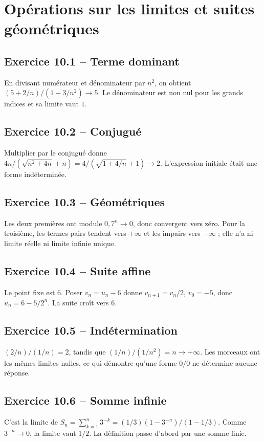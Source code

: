 \chapter{Opérations sur les limites et suites géométriques}
\section*{Exercice 10.1 -- Terme dominant}
En divisant numérateur et dénominateur par $n^2$, on obtient $(5+2/n)/(1-3/n^2)\to5$. Le dénominateur est non nul pour les grands indices et sa limite vaut $1$.

\section*{Exercice 10.2 -- Conjugué}
Multiplier par le conjugué donne $4n/(\sqrt{n^2+4n}+n)=4/(\sqrt{1+4/n}+1)\to2$. L'expression initiale était une forme indéterminée.

\section*{Exercice 10.3 -- Géométriques}
Les deux premières ont module $0{,}7^n\to0$, donc convergent vers zéro. Pour la troisième, les termes pairs tendent vers $+\infty$ et les impairs vers $-\infty$ ; elle n'a ni limite réelle ni limite infinie unique.

\section*{Exercice 10.4 -- Suite affine}
Le point fixe est $6$. Poser $v_n=u_n-6$ donne $v_{n+1}=v_n/2$, $v_0=-5$, donc $u_n=6-5/2^n$. La suite croît vers $6$.

\section*{Exercice 10.5 -- Indétermination}
$(2/n)/(1/n)=2$, tandis que $(1/n)/(1/n^2)=n\to+\infty$. Les morceaux ont les mêmes limites nulles, ce qui démontre qu'une forme $0/0$ ne détermine aucune réponse.

\section*{Exercice 10.6 -- Somme infinie}
C'est la limite de $S_n=\sum_{k=1}^n3^{-k}=(1/3)(1-3^{-n})/(1-1/3)$. Comme $3^{-n}\to0$, la limite vaut $1/2$. La définition passe d'abord par une somme finie.
